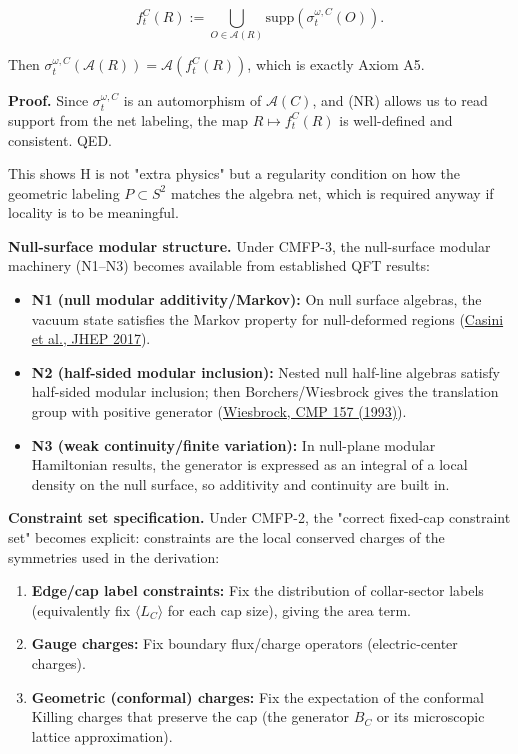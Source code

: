\[
f_t^C(R) := \bigcup_{O \in \mathcal{A}(R)} \mathrm{supp}\left(\sigma_t^{\omega,C}(O)\right).
\]

Then \(\sigma_t^{\omega,C}(\mathcal{A}(R)) = \mathcal{A}(f_t^C(R))\), which is exactly Axiom A5.

\textbf{Proof.} Since \(\sigma_t^{\omega,C}\) is an automorphism of \(\mathcal{A}(C)\), and (NR) allows us to read support from the net labeling, the map \(R \mapsto f_t^C(R)\) is well-defined and consistent. QED.

This shows H is not "extra physics" but a regularity condition on how the geometric labeling \(P \subset S^2\) matches the algebra net, which is required anyway if locality is to be meaningful.

\textbf{Null-surface modular structure.} Under CMFP-3, the null-surface modular machinery (N1--N3) becomes available from established QFT results:

\begin{itemize}
\item
  \textbf{N1 (null modular additivity/Markov):} On null surface algebras, the vacuum state satisfies the Markov property for null-deformed regions (\href{https://arxiv.org/abs/1703.10656}{Casini et al., JHEP 2017}).
\item
  \textbf{N2 (half-sided modular inclusion):} Nested null half-line algebras satisfy half-sided modular inclusion; then Borchers/Wiesbrock gives the translation group with positive generator (\href{https://projecteuclid.org/journals/communications-in-mathematical-physics/volume-157/issue-1/Half-sided-modular-inclusions-of-von-Neumann-algebras/cmp/1104253848.pdf}{Wiesbrock, CMP 157 (1993)}).
\item
  \textbf{N3 (weak continuity/finite variation):} In null-plane modular Hamiltonian results, the generator is expressed as an integral of a local density on the null surface, so additivity and continuity are built in.
\end{itemize}

\textbf{Constraint set specification.} Under CMFP-2, the "correct fixed-cap constraint set" becomes explicit: constraints are the local conserved charges of the symmetries used in the derivation:

\begin{enumerate}
\def\labelenumi{\arabic{enumi}.}
\item
  \textbf{Edge/cap label constraints:} Fix the distribution of collar-sector labels (equivalently fix \(\langle L_C \rangle\) for each cap size), giving the area term.
\item
  \textbf{Gauge charges:} Fix boundary flux/charge operators (electric-center charges).
\item
  \textbf{Geometric (conformal) charges:} Fix the expectation of the conformal Killing charges that preserve the cap (the generator \(B_C\) or its microscopic lattice approximation).
\end{enumerate}


